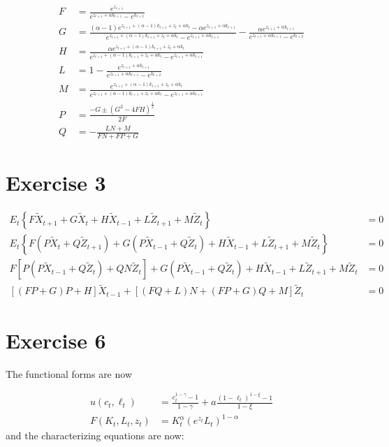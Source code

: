 \documentclass[11pt]{article}
\numberwithin{equation}{section}
\theoremstyle{plain}
\theoremstyle{definition}
\newcommand\parens[1]{\left( #1 \right)}
\newcommand\squares[1]{\left[ #1 \right]}
\newcommand{\1}{\mathbbm 1}
\def\a{\alpha}
\begin{document}
\begin{align*}
F &=  \frac{e^{z_{t+1}}}{e^{z_{t+1} + \a k_{t+1}} - e^{k_{t+2}}} \\
G &= \frac{(\a -1)  e^{z_{t+1} + (\a - 1)k_{t+1} + z_t + \a k_t} - \a e^{z_{t+1} + \a k_{t+1}}}{ e^{z_{t+1} + (\a - 1)k_{t+1} + z_t + \a k_t} - e^{z_{t+1} + \a k_{t+1}}} - \frac{\a e^{z_{t+1} + \a k_{t+1}}}{e^{z_{t+1} + \a k_{t+1}} - e^{k_{t+2}}} \\
H &= \frac{\a  e^{z_{t+1} + (\a - 1)k_{t+1} + z_t + \a k_t}}{ e^{z_{t+1} + (\a - 1)k_{t+1} + z_t + \a k_t} - e^{z_{t+1} + \a k_{t+1}}} \\
L &= 1 -  \frac{e^{z_{t+1} + \a k_{t+1}}}{e^{z_{t+1} + \a k_{t+1}} - e^{k_{t+2}}} \\
M &=  \frac{ e^{z_{t+1} + (\a - 1)k_{t+1} + z_t + \a k_t}}{ e^{z_{t+1} + (\a - 1)k_{t+1} + z_t + \a k_t} -  e^{z_{t+1} + \a k_{t+1}}} \\
P &= \frac{-G \pm (G^2 - 4FH)^{\frac{1}{2}}}{2F} \\
Q &= - \frac{LN + M}{FN + FP + G}
\end{align*}




\section*{Exercise 3}

\begin{align}
E_{t}\left\{F \tilde{X}_{t+1}+G \tilde{X}_{t}+H \tilde{X}_{t-1}+L \tilde{Z}_{t+1}+M \tilde{Z}_{t}\right\} &= 0\\
E_{t}\left\{F \parens{P \tilde{X}_t + Q \tilde{Z}_{t+1}} +G \parens{P \tilde{X}_{t-1} + Q \tilde{Z}_t}+H \tilde{X}_{t-1}+L \tilde{Z}_{t+1}+M \tilde{Z}_{t}\right\} &= 0 \\
F \squares{P \parens{P \tilde{X}_{t-1} + Q \tilde{Z}_t} + Q N \tilde{Z}_{t}} +G \parens{P \tilde{X}_{t-1} + Q \tilde{Z}_t}+H \tilde{X}_{t-1}+L \tilde{Z}_{t+1}+M \tilde{Z}_{t} &= 0 \\
[(F P+G) P+H] \tilde{X}_{t-1}+[(F Q+L) N+(F P+G) Q+M] \tilde{Z}_{t}&=0
\end{align}


\section*{Exercise 6}

The functional forms are now 

\begin{align} 
 u\left(c_{t}, \ell_{t}\right) &=\frac{c_{t}^{1-\gamma}-1}{1-\gamma}+a \frac{\left(1-\ell_{t}\right)^{1-\xi}-1}{1-\xi} \\ 
  F\left(K_{t}, L_{t}, z_{t}\right) &= K_{t}^{\alpha} \parens{e^{z_{t}} L_{t}}^{1-\alpha} 
 \end{align}
and the characterizing equations are now:
\end{document}
